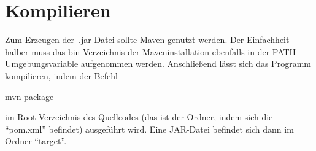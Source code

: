 \section{Kompilieren}\label{sec:kompilieren}
Zum Erzeugen der~.jar-Datei sollte Maven genutzt werden.
Der Einfachheit halber muss das bin-Verzeichnis der Maveninstallation ebenfalls in der PATH-Umgebungsvariable aufgenommen werden.
Anschließend lässt sich das Programm kompilieren, indem der Befehl
\begin{center}
    \colorbox{gray!20}{
        \begin{minipage}{0.9\textwidth}
            mvn package
        \end{minipage}
    }
\end{center}
im Root-Verzeichnis des Quellcodes (das ist der Ordner, indem sich die \enquote{pom.xml} befindet) ausgeführt wird.
Eine JAR-Datei befindet sich dann im Ordner \enquote{target}.